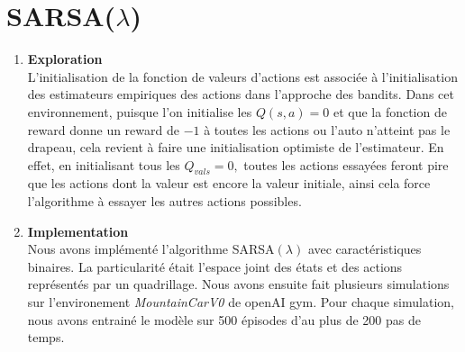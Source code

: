 \documentclass[letterpaper,11pt]{article}
\begin{document}
\section{SARSA($\lambda$)}

\begin{enumerate}[label=(\alph*)]

\item \textbf{Exploration}\\
L'initialisation de la fonction de valeurs d'actions est associée à l'initialisation des estimateurs empiriques des actions dans l'approche des bandits. Dans cet environnement, puisque l'on initialise les $Q(s,a)=0$ et que la fonction de reward donne un reward de $-1$ à toutes les actions ou l'auto n'atteint pas le drapeau, cela revient à faire une initialisation optimiste de l'estimateur. En effet, en initialisant tous les $Q_{vals}=0,$ toutes les actions essayées feront pire que les actions dont la valeur est encore la valeur initiale, ainsi cela force l'algorithme à essayer les autres actions possibles.

\item \textbf{Implementation}\\
Nous avons implémenté l'algorithme SARSA$(\lambda)$ avec caractéristiques binaires. La particularité était l'espace joint des états et des actions représentés par un quadrillage.
Nous avons ensuite fait plusieurs simulations sur l'environement \textit{MountainCarV0} de openAI gym.
Pour chaque simulation, nous avons entrainé le modèle sur 500 épisodes d'au plus de 200 pas de temps.\\


\end{enumerate}
\end{document}
